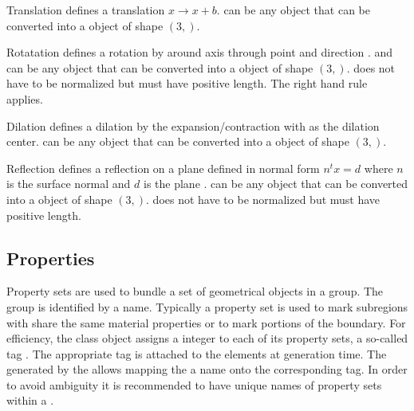 \begin{classdesc}{Translation}{}
defines a translation $x \to x+b$.  can be any object that can be converted 
into a \numarray object of shape $(3,)$.
\end{classdesc}
              
\begin{classdesc}{Rotatation}{ }
defines a rotation by  around axis through point  and direction . 
 and  can be any object that can be converted 
into a \numarray object of shape $(3,)$.
 does not have to be normalized but must have positive length. The right hand rule~\cite{RIGHTHANDRULE}
applies.
\end{classdesc}


\begin{classdesc}{Dilation}{}
defines a dilation by the expansion/contraction  with 
 as the dilation center.
 can be any object that can be converted 
into a \numarray object of shape $(3,)$.
\end{classdesc}

\begin{classdesc}{Reflection}{}
defines a reflection on a plane defined in normal form $n^t x = d$ 
where $n$ is the surface normal  and $d$ is the plane .
 can be any object that can be converted 
into a \numarray object of shape $(3,)$.
 does not have to be normalized but must have positive length. 
\end{classdesc}

\subsection{Properties}

Property sets are used to bundle a set of geometrical objects in a group. The group
is identified by a name. Typically a property set is used to mark
subregions with share the same material properties or to mark portions of the boundary. 
For efficiency, the \Design class object assigns a integer to each of its property sets,
a so-called tag . The appropriate tag is attached to the elements at generation time.
The \TagMap generated by the \Design allows mapping the a name onto the corresponding tag.
In order to avoid ambiguity it is recommended to have unique names of property sets within a \Design. 
 

